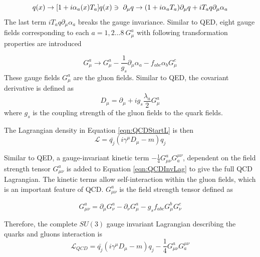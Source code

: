 \begin{equation}
q(x) \rightarrow [ 1 + i\alpha_{a}(x)T_{a}]q(x) \\
\ni ~ \partial_{\mu}q \rightarrow ( 1 + i\alpha_{a}T_{a})\partial_{\mu}q + iT_{a}q\partial_{\mu} \alpha_{a}
\end{equation}
The last term $iT_{a}q\partial_{\mu} \alpha_{a}$ breaks the gauge invariance. Similar to QED, eight gauge fields corresponding to each $a = {1,2...8} ~ G_{\mu}^{a}$ with following transformation properties are introduced 

\begin{equation}
G_{\mu}^{a} \rightarrow G_{\mu}^{a} - \frac{1}{g_{s}} \partial_{\mu} \alpha_{a} - f_{abc}\alpha_{b}G^{c}_{\mu}
\label{eqn:SU3GaugeField}
\end{equation}
These gauge fields $G_{\mu}^{a}$ are the gluon fields. Similar to QED, the covariant derivative is defined as
\begin{equation}
D_{\mu} = \partial_{\mu} + ig_{s}\frac{\lambda_{a}}{2}G_{\mu}^{a} 
\label{eqn:SU3CovDerv}
\end{equation}
where $g_{s}$ is the coupling strength of the gluon fields to the quark fields.

The Lagrangian density in Equation \ref{eqn:QCDStartL} is then 
\begin{equation}
\mathcal{L} = \bar{q_{j}}(i\gamma^{\mu}D_{\mu} - m )q_{j}
\label{eqn:QCDInvLag}
\end{equation}

Similar to QED, a gauge-invariant kinetic term $-\frac{1}{4}G^{a}_{\mu\nu}G^{\mu\nu}_{a}$, dependent on the field strength tensor $G^{a}_{\mu\nu}$ is added to Equation \ref{eqn:QCDInvLag} to give the full QCD Lagrangian. The kinetic terms allow self-interaction within the gluon fields, which is an important feature of QCD. $G^{a}_{\mu\nu}$ is the field strength tensor defined as

\begin{equation}
G^{a}_{\mu\nu} = \partial_{\mu}G^{a}_{\nu} - \partial_{\nu}G^{a}_{\mu} - g_{s}f_{abc}G^{b}_{\mu}G^{c}_{\nu}
\label{eqn:QCDFullLag}
\end{equation}

Therefore, the complete $SU(3)$ gauge invariant Lagrangian describing the quarks and gluons interaction is
\begin{equation}
\mathcal{L}_{QCD} = \bar{q_{j}}(i\gamma^{\mu}D_{\mu} - m )q_{j} -\frac{1}{4}G^{a}_{\mu\nu}G^{\mu\nu}_{a} 
\label{eqn:QCDCompleteLag}
\end{equation}

